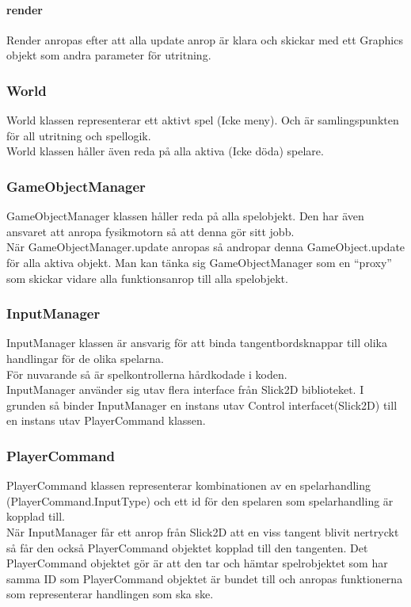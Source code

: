 \paragraph{render}
Render anropas efter att alla update anrop är klara och skickar med ett Graphics objekt som andra parameter för utritning.\\
\subsubsection{World}
World klassen representerar ett aktivt spel (Icke meny). Och är samlingspunkten för all utritning och spellogik.\\
World klassen håller även reda på alla aktiva (Icke döda) spelare.\\
\subsubsection{GameObjectManager}
GameObjectManager klassen håller reda på alla spelobjekt. Den har även ansvaret att anropa fysikmotorn så att denna gör sitt jobb.\\
När GameObjectManager.update anropas så andropar denna GameObject.update för alla aktiva objekt. Man kan tänka sig GameObjectManager som en ``proxy'' som skickar vidare alla funktionsanrop till alla spelobjekt.\\
\subsubsection{InputManager}
InputManager klassen är ansvarig för att binda tangentbordsknappar till olika handlingar för de olika spelarna.\\
För nuvarande så är spelkontrollerna hårdkodade i koden.\\
InputManager använder sig utav flera interface från Slick2D biblioteket. I grunden så binder InputManager en instans utav Control interfacet(Slick2D) till en instans utav PlayerCommand klassen.\\
\subsubsection{PlayerCommand}
PlayerCommand klassen representerar kombinationen av en spelarhandling (PlayerCommand.InputType) och ett id för den spelaren som spelarhandling är kopplad till.\\
När InputManager får ett anrop från Slick2D att en viss tangent blivit nertryckt så får den också PlayerCommand objektet kopplad till den tangenten. Det PlayerCommand objektet gör är att den tar och hämtar spelrobjektet som har samma ID som PlayerCommand objektet är bundet till och anropas funktionerna som representerar handlingen som ska ske.\\
